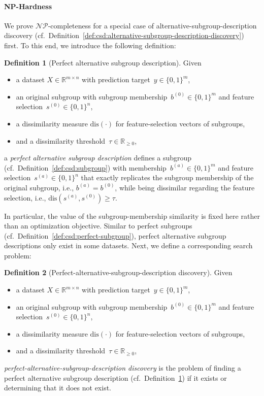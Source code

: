 \documentclass{article}
\theoremstyle{definition}
\newtheorem{definition}{Definition}
\begin{document}
\paragraph{NP-Hardness}

We prove $\mathcal{NP}$-completeness for a special case of alternative-subgroup-description discovery (cf.~Definition~\ref{def:csd:alternative-subgroup-description-discovery}) first.
To this end, we introduce the following definition:
%
\begin{definition}[Perfect alternative subgroup description]
	Given
	\begin{itemize}[noitemsep]
		\item a dataset $X \in \mathbb{R}^{m \times n}$ with prediction target~$y \in \{0, 1\}^m$,
		\item an original subgroup with subgroup membership~$b^{(0)} \in \{0, 1\}^m$ and feature selection~$s^{(0)} \in \{0, 1\}^n$,
		\item a dissimilarity measure $\text{dis}(\cdot)$ for feature-selection vectors of subgroups,
		\item and a dissimilarity threshold~$\tau \in \mathbb{R}_{\geq 0}$,
	\end{itemize}
	a \emph{perfect alternative subgroup description} defines a subgroup (cf.~Definition~\ref{def:csd:subgroup}) with membership~$b^{(a)} \in \{0, 1\}^m$ and feature selection~$s^{(a)} \in \{0, 1\}^n$ that exactly replicates the subgroup membership of the original subgroup, i.e., $b^{(a)} = b^{(0)}$, while being dissimilar regarding the feature selection, i.e., $\text{dis}(s^{(a)}, s^{(0)}) \geq \tau$.
	\label{def:csd:perfect-alternative}
\end{definition}
%
In particular, the value of the subgroup-membership similarity is fixed here rather than an optimization objective.
Similar to perfect subgroups (cf.~Definition~\ref{def:csd:perfect-subgroup}), perfect alternative subgroup descriptions only exist in some datasets.
Next, we define a corresponding search problem:
%
\begin{definition}[Perfect-alternative-subgroup-description discovery]
	Given
	\begin{itemize}[noitemsep]
		\item a dataset $X \in \mathbb{R}^{m \times n}$ with prediction target~$y \in \{0, 1\}^m$,
		\item an original subgroup with subgroup membership~$b^{(0)} \in \{0, 1\}^m$ and feature selection~$s^{(0)} \in \{0, 1\}^n$,
		\item a dissimilarity measure $\text{dis}(\cdot)$ for feature-selection vectors of subgroups,
		\item and a dissimilarity threshold~$\tau \in \mathbb{R}_{\geq 0}$,
	\end{itemize}
	\emph{perfect-alternative-subgroup-description discovery} is the problem of finding a perfect alternative subgroup description (cf.~Definition~\ref{def:csd:perfect-alternative}) if it exists or determining that it does not exist.
	\label{def:csd:perfect-alternative-subgroup-description-discovery}
\end{definition}
\end{document}
